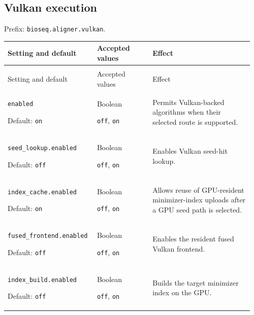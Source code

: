 \subsection{Vulkan execution}

Prefix: \nolinkurl{bioseq.aligner.vulkan}.

\begingroup
\small
\setlength{\tabcolsep}{4pt}
\renewcommand{\arraystretch}{1.16}
\begin{longtable}{@{}>{\raggedright\arraybackslash}p{0.34\linewidth}>{\raggedright\arraybackslash}p{0.22\linewidth}>{\raggedright\arraybackslash}p{0.40\linewidth}@{}}
\toprule
Setting and default & Accepted values & Effect \\
\midrule
\endfirsthead
\multicolumn{3}{@{}l}{Prefix: \nolinkurl{bioseq.aligner.vulkan} (continued)} \\
\toprule
Setting and default & Accepted values & Effect \\
\midrule
\endhead
\bottomrule
\endfoot
\nolinkurl{enabled}\par Default: \texttt{on} & Boolean\par \texttt{off}, \texttt{on} & Permits Vulkan-backed algorithms when their selected route is supported. \\[4pt]
\nolinkurl{seed_lookup.enabled}\par Default: \texttt{off} & Boolean\par \texttt{off}, \texttt{on} & Enables Vulkan seed-hit lookup. \\[4pt]
\nolinkurl{index_cache.enabled}\par Default: \texttt{on} & Boolean\par \texttt{off}, \texttt{on} & Allows reuse of GPU-resident minimizer-index uploads after a GPU seed path is selected. \\[4pt]
\nolinkurl{fused_frontend.enabled}\par Default: \texttt{off} & Boolean\par \texttt{off}, \texttt{on} & Enables the resident fused Vulkan frontend. \\[4pt]
\nolinkurl{index_build.enabled}\par Default: \texttt{off} & Boolean\par \texttt{off}, \texttt{on} & Builds the target minimizer index on the GPU. \\[4pt]

\end{longtable}
